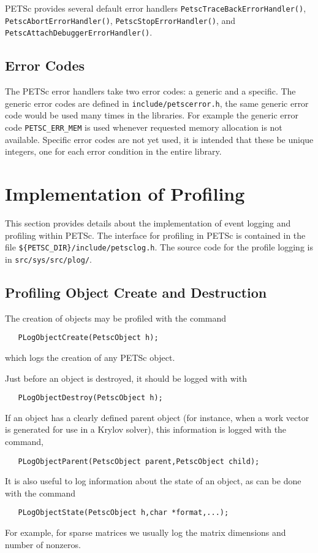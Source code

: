 PETSc provides several default error handlers
{\tt PetscTraceBackErrorHandler()}, {\tt PetscAbortErrorHandler()}, 
{\tt PetscStopErrorHandler()}, and {\tt PetscAttachDebuggerErrorHandler()}. 

\subsection{Error Codes}

The PETSc error handlers take two error codes: a generic and a specific.
The generic error codes are defined in {\tt include/petscerror.h}, the same generic
error code would be used many times in the libraries. For example the 
generic error code {\tt PETSC\_ERR\_MEM} is used whenever requested memory allocation
is not available. Specific error codes are not yet used, it is intended that 
these be unique integers, one for each error condition in the entire library.



\section{Implementation of Profiling}
\label{sec:profimpl}

This section provides details about the implementation of event
logging and profiling within PETSc.   
The interface for profiling in PETSc is contained in the file 
{\tt \$\{PETSC\_DIR\}/include/petsclog.h}. The source code for the profile logging
is in {\tt src/sys/src/plog/}.

\subsection{Profiling Object Create and Destruction}

The creation of objects may be profiled with the command
\begin{verbatim}
   PLogObjectCreate(PetscObject h);
\end{verbatim}
which logs the creation of any PETSc object. 

Just before an object is destroyed, it should be  logged with
with  
\begin{verbatim}
   PLogObjectDestroy(PetscObject h);
\end{verbatim}

If an object has a clearly defined parent object (for instance, when 
a work vector is generated for use in a Krylov solver), this information
is logged with the command, 
\begin{verbatim}
   PLogObjectParent(PetscObject parent,PetscObject child);
\end{verbatim}
It is also useful to log information about the state of an object, as can
be done with the command 
\begin{verbatim}
   PLogObjectState(PetscObject h,char *format,...);
\end{verbatim}
For example, for sparse matrices we usually log the matrix 
dimensions and number of nonzeros.

